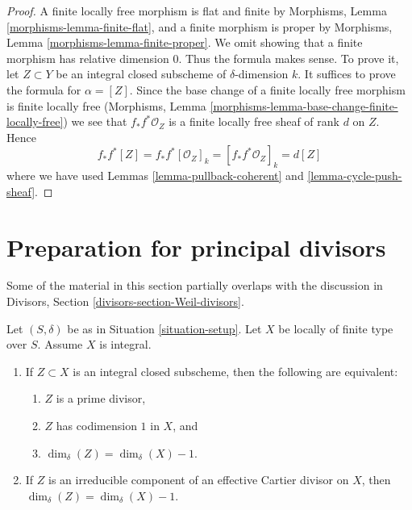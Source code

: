 \begin{proof}
A finite locally free morphism is flat and finite by
Morphisms, Lemma \ref{morphisms-lemma-finite-flat},
and a finite morphism is proper
by Morphisms, Lemma \ref{morphisms-lemma-finite-proper}.
We omit showing that a finite
morphism has relative dimension $0$. Thus the formula makes sense.
To prove it, let $Z \subset Y$ be an integral closed subscheme
of $\delta$-dimension $k$. It suffices to prove the formula
for $\alpha = [Z]$. Since the base change of a finite locally free
morphism is finite locally free
(Morphisms, Lemma \ref{morphisms-lemma-base-change-finite-locally-free})
we see that $f_*f^*\mathcal{O}_Z$ is a finite locally free sheaf of
rank $d$ on $Z$. Hence
$$
f_*f^*[Z] = f_*f^*[\mathcal{O}_Z]_k =
[f_*f^*\mathcal{O}_Z]_k = d[Z]
$$
where we have used Lemmas \ref{lemma-pullback-coherent} and
\ref{lemma-cycle-push-sheaf}.
\end{proof}








\section{Preparation for principal divisors}
\label{section-preparation-principal-divisors}

\noindent
Some of the material in this section partially overlaps with the
discussion in Divisors, Section \ref{divisors-section-Weil-divisors}.

\begin{lemma}
\label{lemma-divisor-delta-dimension}
Let $(S, \delta)$ be as in Situation \ref{situation-setup}.
Let $X$ be locally of finite type over $S$. Assume $X$ is
integral.
\begin{enumerate}
\item If $Z \subset X$ is an integral closed subscheme, then
the following are equivalent:
\begin{enumerate}
\item $Z$ is a prime divisor,
\item $Z$ has codimension $1$ in $X$, and
\item $\dim_\delta(Z) = \dim_\delta(X) - 1$.
\end{enumerate}
\item If $Z$ is an irreducible component of an effective Cartier
divisor on $X$, then $\dim_\delta(Z) = \dim_\delta(X) - 1$.
\end{enumerate}
\end{lemma}

